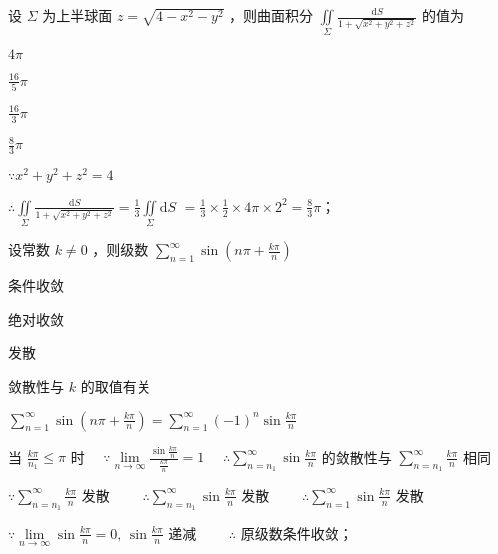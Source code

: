 \begin{question}[points = 3]
    设 $\Sigma$ 为上半球面 $z = \sqrt{4 - x^2 - y^2}$ ，则曲面积分 $\iint\limits_{\Sigma} \frac{\mathrm{d}S}{1 + \sqrt{x^2 + y^2 + z^2}}$
    的值为 \paren[D]
\end{question}
\begin{choices}
    \item $4\pi$
    \item $\frac{16}{5}\pi$
    \item $\frac{16}{3}\pi$
    \item $\frac{8}{3}\pi$
\end{choices}
\begin{solution}
    $\because x^2 + y^2 + z^2 = 4$

    $\therefore \iint\limits_{\Sigma} \frac{\mathrm{d}S}{1 + \sqrt{x^2 + y^2 + z^2}} = \frac{1}{3} \iint\limits_{\Sigma} \mathrm{d}S$
    $= \frac{1}{3} \times \frac{1}{2} \times 4\pi \times 2^2 = \frac{8}{3}\pi$；
\end{solution}

\begin{question}[points = 3]
    设常数 $k \neq 0$ ，则级数 $\sum\limits_{n = 1}^{\infty} \sin{(n\pi + \frac{k\pi}{n})}$ \paren[A]
\end{question}
\begin{choices}
    \item 条件收敛
    \item 绝对收敛
    \item 发散
    \item 敛散性与 $k$ 的取值有关
\end{choices}
\begin{solution}
    $\sum\limits_{n = 1}^{\infty} \sin{(n\pi + \frac{k\pi}{n})} = \sum\limits_{n = 1}^{\infty} (-1)^n\sin{\frac{k\pi}{n}}$

    当 $\frac{k\pi}{n_1} \leq \pi$ 时 $\quad \because \lim\limits_{n \to \infty} \frac{\sin{\frac{k\pi}{n}}}{\frac{k\pi}{n}} = 1 \quad$
    $\therefore \sum\limits_{n = n_1}^{\infty} \sin{\frac{k\pi}{n}}$ 的敛散性与 $\sum\limits_{n = n_1}^{\infty} \frac{k\pi}{n}$ 相同

    $\because \sum\limits_{n = n_1}^{\infty} \frac{k\pi}{n}$ 发散 $\qquad \therefore \sum\limits_{n = n_1}^{\infty} \sin{\frac{k\pi}{n}}$ 发散
    $\qquad \therefore \sum\limits_{n = 1}^{\infty} \sin{\frac{k\pi}{n}}$ 发散

    $\because \lim\limits_{n \to \infty} \sin{\frac{k\pi}{n}} = 0, \, \sin{\frac{k\pi}{n}}$ 递减
    $\qquad \therefore$ 原级数条件收敛；
\end{solution}

